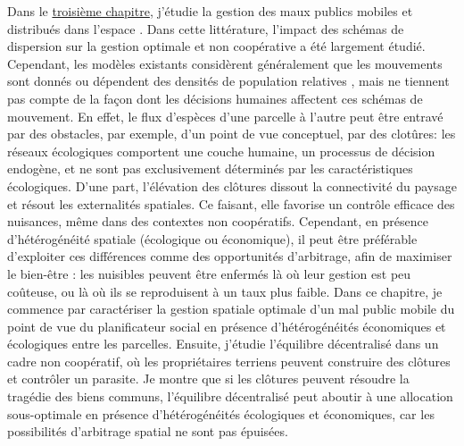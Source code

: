 Dans le \hyperref[chapitre3]{troisième chapitre}, j'étudie la gestion des maux publics mobiles et distribués dans l'espace \citep{costello_private_2017}.
Dans cette littérature, l'impact des schémas de dispersion sur la gestion optimale et non coopérative a été largement étudié. Cependant, les modèles existants considèrent généralement que les mouvements sont donnés ou dépendent des densités de population relatives \citep{huffaker_optimal_1992,bhat_controlling_1996, sanchirico_bioeconomics_1999}, mais ne tiennent pas compte de la façon dont les décisions humaines affectent ces schémas de mouvement. 
En effet, le flux d'espèces d'une parcelle à l'autre peut être entravé par des obstacles, par exemple, d'un point de vue conceptuel, par des clotûres: les réseaux écologiques comportent une couche humaine, un processus de décision endogène, et ne sont pas exclusivement déterminés par les caractéristiques écologiques. D'une part, l'élévation des clôtures dissout la connectivité du paysage et résout les externalités spatiales. Ce faisant, elle favorise un contrôle efficace des nuisances, même dans des contextes non coopératifs. Cependant, en présence d'hétérogénéité spatiale (écologique ou économique), il peut être préférable d'exploiter ces différences comme des opportunités d'arbitrage, afin de maximiser le bien-être : les nuisibles peuvent être enfermés là où leur gestion est peu coûteuse, ou là où ils se reproduisent à un taux plus faible. Dans ce chapitre, je commence par caractériser la gestion spatiale optimale d'un mal public mobile du point de vue du planificateur social en présence d'hétérogénéités économiques et écologiques entre les parcelles. Ensuite, j'étudie l'équilibre décentralisé dans un cadre non coopératif, où les propriétaires terriens peuvent construire des clôtures et contrôler un parasite. Je montre que si les clôtures peuvent résoudre la tragédie des biens communs, l'équilibre décentralisé peut aboutir à une allocation sous-optimale en présence d'hétérogénéités écologiques et économiques, car les possibilités d'arbitrage spatial ne sont pas épuisées. \\

